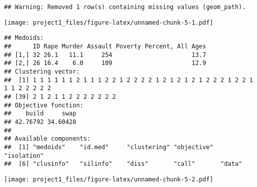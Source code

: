 \documentclass[]{article}
\newenvironment{Shaded}{\begin{snugshade}}{\end{snugshade}}
\newcommand{\DataTypeTok}[1]{\textcolor[rgb]{0.13,0.29,0.53}{#1}}
\newcommand{\DecValTok}[1]{\textcolor[rgb]{0.00,0.00,0.81}{#1}}
\newcommand{\KeywordTok}[1]{\textcolor[rgb]{0.13,0.29,0.53}{\textbf{#1}}}
\newcommand{\NormalTok}[1]{#1}
\newcommand{\OperatorTok}[1]{\textcolor[rgb]{0.81,0.36,0.00}{\textbf{#1}}}
\newcommand{\StringTok}[1]{\textcolor[rgb]{0.31,0.60,0.02}{#1}}
\begin{document}
\begin{verbatim}
## Warning: Removed 1 row(s) containing missing values (geom_path).
\end{verbatim}

\texttt{[image: project1\_files/figure-latex/unnamed-chunk-5-1.pdf]}

\begin{Shaded}
\end{Shaded}

\begin{verbatim}
## Medoids:
##      ID Rape Murder Assault Poverty Percent, All Ages
## [1,] 32 26.1   11.1     254                      13.7
## [2,] 26 16.4    6.0     109                      12.9
## Clustering vector:
##  [1] 1 1 1 1 1 1 2 1 1 1 2 2 1 2 2 2 2 1 2 1 2 1 2 1 2 2 2 1 2 2 1 1 1 2 2 2 2 2
## [39] 2 1 2 1 1 2 2 2 2 2 2 2
## Objective function:
##    build     swap 
## 42.76792 34.60428 
## 
## Available components:
##  [1] "medoids"    "id.med"     "clustering" "objective"  "isolation" 
##  [6] "clusinfo"   "silinfo"    "diss"       "call"       "data"
\end{verbatim}

\begin{Shaded}
\end{Shaded}

\texttt{[image: project1\_files/figure-latex/unnamed-chunk-5-2.pdf]}

\begin{Shaded}
\end{Shaded}
\end{document}
